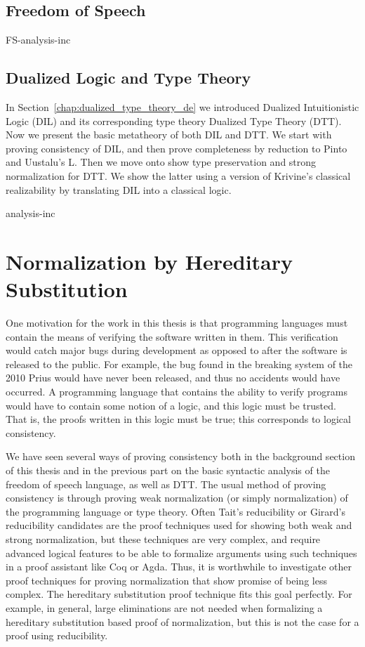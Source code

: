 \documentclass[phd,appendix,dedicationpage,ackpage,epigraphpage]{uithesis}
\begin{document}
\chapter{Freedom of Speech}
\label{chap:freedom_of_speech_anal}
{FS-analysis-inc}

\chapter{Dualized Logic and Type Theory}
\label{chap:dualized_type_theory_anal}

In Section~\ref{chap:dualized_type_theory_de} we introduced Dualized
Intuitionistic Logic (DIL) and its corresponding type theory Dualized
Type Theory (DTT).  Now we present the basic metatheory of both DIL
and DTT.  We start with proving consistency of DIL, and then prove
completeness by reduction to Pinto and Uustalu's L. Then we move onto
show type preservation and strong normalization for DTT.  We show the
latter using a version of Krivine's classical realizability by
translating DIL into a classical logic.

{analysis-inc}

\part{Normalization by Hereditary Substitution}
\label{part:norm-hs}

One motivation for the work in this thesis is that programming
languages must contain the means of verifying the software written in
them.  This verification would catch major bugs during development as
opposed to after the software is released to the public.  For example,
the bug found in the breaking system of the 2010 Prius would have
never been released, and thus no accidents would have occurred.  A
programming language that contains the ability to verify programs
would have to contain some notion of a logic, and this logic must be
trusted.  That is, the proofs written in this logic must be true; this
corresponds to logical consistency.

We have seen several ways of proving consistency both in the
background section of this thesis and in the previous part on the
basic syntactic analysis of the freedom of speech language, as well as
DTT.  The usual method of proving consistency is through proving weak
normalization (or simply normalization) of the programming language or
type theory.  Often Tait's reducibility or Girard's reducibility
candidates are the proof techniques used for showing both weak and
strong normalization, but these techniques are very complex, and
require advanced logical features to be able to formalize arguments
using such techniques in a proof assistant like Coq or Agda.  Thus, it
is worthwhile to investigate other proof techniques for proving
normalization that show promise of being less complex.  The hereditary
substitution proof technique fits this goal perfectly.  For example,
in general, large eliminations are not needed when formalizing a
hereditary substitution based proof of normalization, but this is not
the case for a proof using reducibility.
\end{document}
